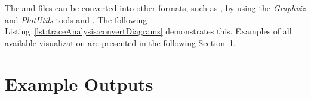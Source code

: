 \noindent The  and  files can be converted into other formats, %
such as , by using the \textit{Graphviz} and \textit{PlotUtils} tools %
 and . %
The following Listing~\ref{lst:traceAnalysis:convertDiagrams} demonstrates this. %
Examples of all available visualization are presented in the following %
Section~\ref{sec:traceAnalysisExamples}.



% 


\section{Example \KiekerTraceAnalysis{} Outputs}\label{sec:traceAnalysisExamples}
